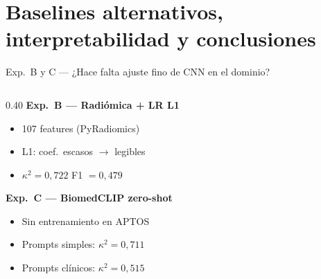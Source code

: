 \documentclass[aspectratio=169, 11pt]{beamer}
\begin{document}
\section{Baselines alternativos, interpretabilidad y conclusiones}

\begin{frame}{Exp.~B y C --- ¿Hace falta ajuste fino de CNN en el dominio?}

  \begin{columns}[T]
    \begin{column}{0.40\textwidth}
      \textbf{Exp.~B --- Radiómica + LR L1}
      \begin{itemize}
        \item 107 features (PyRadiomics)
        \item L1: coef.\ escasos $\to$ legibles
        \item $\kappa^2 = 0{,}722$ \quad F1 $= 0{,}479$
      \end{itemize}

      \vspace{8pt}
      \textbf{Exp.~C --- BiomedCLIP zero-shot}
      \begin{itemize}
        \item Sin entrenamiento en APTOS
        \item Prompts simples: $\kappa^2 = 0{,}711$
        \item Prompts clínicos: $\kappa^2 = 0{,}515$
      \end{itemize}
    \end{column}


\end{columns}
\end{frame}
\end{document}
